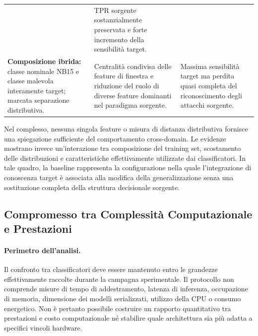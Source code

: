 \begin{table}[H]
\begin{tabularx}{\textwidth}{>{\raggedright\arraybackslash}X >{\raggedright\arraybackslash}X >{\raggedright\arraybackslash}X}
        & TPR sorgente sostanzialmente preservata e forte incremento della sensibilità target. \\
        \addlinespace
        \textbf{Composizione ibrida:} classe nominale NB15 e classe malevola interamente target; marcata separazione distributiva.
        & Centralità condivisa delle feature di finestra e riduzione del ruolo di diverse feature dominanti nel paradigma sorgente.
        & Massima sensibilità target ma perdita quasi completa del riconoscimento degli attacchi sorgente. \\
        \bottomrule
    \end{tabularx}
\end{table}

Nel complesso, nessuna singola feature o misura di distanza distributiva fornisce una spiegazione sufficiente del comportamento cross-domain. 
Le evidenze mostrano invece un'interazione tra composizione del training set, scostamento delle distribuzioni e caratteristiche effettivamente utilizzate dai classificatori. 
In tale quadro, la baseline rappresenta la configurazione nella quale l'integrazione di conoscenza target è associata alla modifica della generalizzazione senza una sostituzione completa della struttura decisionale sorgente.



\subsection{Compromesso tra Complessità Computazionale e Prestazioni}
\label{subsec:tradeoff_complessita_prestazioni}

\paragraph{Perimetro dell'analisi.}
Il confronto tra classificatori deve essere mantenuto entro le grandezze effettivamente raccolte durante la campagna sperimentale. 
Il protocollo non comprende misure di tempo di addestramento, latenza di inferenza, occupazione di memoria, dimensione dei modelli serializzati, utilizzo della CPU o consumo energetico. 
Non è pertanto possibile costruire un rapporto quantitativo tra prestazioni e costo computazionale né stabilire quale architettura sia più adatta a specifici vincoli hardware.

